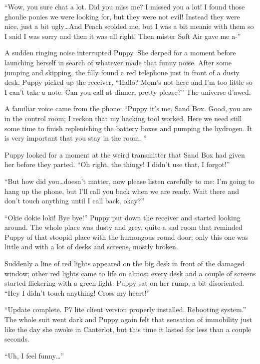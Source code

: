 ``Wow, you sure chat a lot. Did you miss me? I missed you a lot! I found those ghoulie ponies we were looking for, but they were not evil! Instead they were nice, just a bit ugly\dots And Peach scolded me, but I was a bit meanie with them so I said I was sorry and then it was all right! Then mister Soft Air gave me a-''

A sudden ringing noise interrupted Puppy. She derped for a moment before launching herself in search of whatever made that funny noise. After some jumping and skipping, the filly found a red telephone just in front of a dusty desk. Puppy picked up the receiver, ``Hallo? Mom's not here and I'm too little so I can't take a note. Can you call at dinner, pretty please?'' The universe d'awed.

A familiar voice came from the phone: ``Puppy it's me, Sand Box. Good, you are in the control room; I reckon that my hacking tool worked. Here we need still some time to finish replenishing the battery boxes and pumping the hydrogen. It is very important that you stay in the room. ''

Puppy looked for a moment at the weird transmitter that Sand Box had given her before they parted. ``Oh right, the thingy! I didn't use that, I forgot!''

``But how did you\dots doesn't matter, now please listen carefully to me: I'm going to hang up the phone, but I'll call you back when we are ready. Wait there and don't touch anything until I call back, okay?''

``Okie dokie loki! Bye bye!'' Puppy put down the receiver and started looking around. The whole place was dusty and grey, quite a sad room that reminded Puppy of that stoopid place with the humongous round door; only this one was little and with a lot of desks and screens, mostly broken.

Suddenly a line of red lights appeared on the big desk in front of the damaged window; other red lights came to life on almost every desk and a couple of screens started flickering with a green light. Puppy sat on her rump, a bit disoriented. ``Hey I didn't touch anything! Cross my heart!''

``{\mt Update complete. P7 lite client version properly installed. Rebooting system.}'' The whole suit went dark and Puppy again felt that sensation of immobility just like the day she awoke in Canterlot, but this time it lasted for less than a couple seconds.

``Uh, I feel funny\dots''

